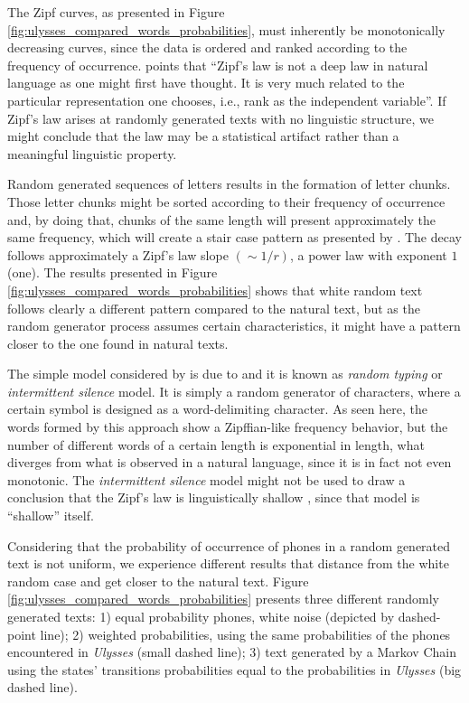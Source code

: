 The Zipf curves, as presented in Figure \ref{fig:ulysses_compared_words_probabilities}, 
must inherently be monotonically decreasing curves, since the data is ordered and ranked
according to the frequency of occurrence. \cite{li1992} points that 
``Zipf's law is not a deep law in natural language as
one might first have thought. It is very much related to the particular representation one
chooses, i.e., rank as the independent variable''. 
If Zipf's law arises at randomly generated texts with no linguistic structure, we might conclude
that the law may be a statistical artifact rather than a meaningful linguistic property.

Random generated sequences of letters results in the formation of letter chunks. Those letter chunks
might be sorted according to their frequency of occurrence and, by doing that, chunks of the same
length will present approximately the same frequency, which will create a stair case pattern as presented 
by \citet{li1992}. The decay follows approximately a Zipf's law slope
$(\sim 1/r)$, a power law with exponent $1$ (one). 
The results presented in Figure \ref{fig:ulysses_compared_words_probabilities} shows that
white random text follows clearly a different pattern compared to the natural text,
but as the random generator process assumes certain characteristics, it might have a pattern
closer to the one found in natural texts.

The simple model considered by \citet{li1992} is due to \cite{miller1957,mandelbrot1965}
and it is known as \textit{random typing} or \textit{intermittent silence} model.
It is simply a random generator of characters, where a certain symbol is designed as 
a word-delimiting character. As seen here, the words formed by this approach
show a Zipffian-like frequency behavior, but the number of different words of a certain
length is exponential in length, what diverges from what is observed in a natural language,
since it is in fact not even monotonic.
The \textit{intermittent silence} model might not be used to draw a conclusion that
the Zipf's law is linguistically shallow \citep{mandelbrot1982}, since that model is ``shallow'' itself.


Considering that the probability of occurrence of phones in a random generated text is not uniform,
we experience different results that distance from the white random case and get closer to the natural text.
Figure \ref{fig:ulysses_compared_words_probabilities} presents three different randomly generated texts:
1) equal probability phones, white noise (depicted by dashed-point line); 2) weighted probabilities, using 
the same probabilities of the phones encountered in \textit{Ulysses} (small dashed line); 3) text generated
by a Markov Chain using the states' transitions probabilities equal to the probabilities in \textit{Ulysses} 
(big dashed line).

